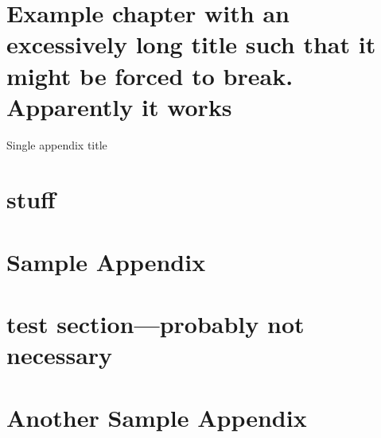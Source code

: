 \documentclass[microsys]{ritthesis}
\providecommand{\chapter}[1]{\section{#1}}
\begin{document}
\chapter{Example chapter with an excessively long title such that it might be forced to break. Apparently it works}
\lipsum[8-12]

\nocite{cheung,zhao,cao,zhang}

\nocite{*}


\begin{theappendix}{Single appendix title}
	\section{stuff}
	\lipsum[15-21]
\end{theappendix}

\appendix

\chapter{Sample Appendix}

\section{test section---probably not necessary}
\lipsum[6-12]
\chapter{Another Sample Appendix}
\lipsum[10-11]

\end{document}
